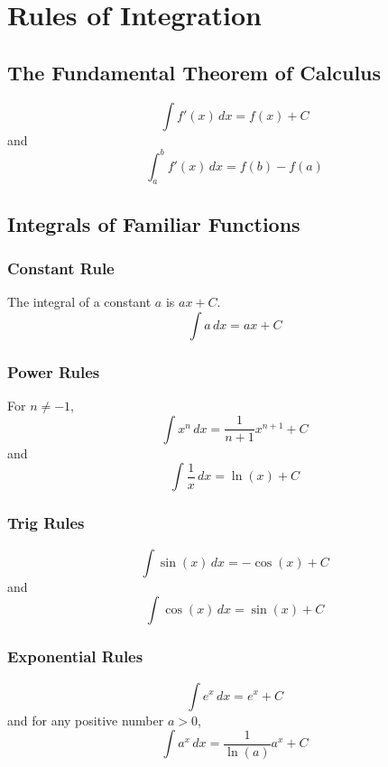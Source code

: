 \documentclass[
]{book}
\begin{document}
\hypertarget{rules-of-integration}{%
\chapter{Rules of Integration}\label{rules-of-integration}}

\hypertarget{the-fundamental-theorem-of-calculus}{%
\section{The Fundamental Theorem of Calculus}\label{the-fundamental-theorem-of-calculus}}

\[ \int f'(x) \, dx = f(x) + C\]
and
\[ \int_a^b f'(x) \, dx = f(b)-f(a)\]

\hypertarget{integrals-of-familiar-functions}{%
\section{Integrals of Familiar Functions}\label{integrals-of-familiar-functions}}

\hypertarget{constant-rule-1}{%
\subsection{Constant Rule}\label{constant-rule-1}}

The integral of a constant \(a\) is \(ax+C\).
\[\int a \, dx= ax +C\]

\hypertarget{power-rules}{%
\subsection{Power Rules}\label{power-rules}}

For \(n \neq -1\),
\[\int x^n \, dx= \frac{1}{n+1} x^{n+1} +C\]
and
\[
\int \frac{1}{x} \, dx = \ln (x) + C
\]

\hypertarget{trig-rules-1}{%
\subsection{Trig Rules}\label{trig-rules-1}}

\[\int \sin(x) \, dx = -\cos(x) +C\]
and
\[\int \cos(x) \, dx= \sin(x) + C\]

\hypertarget{exponential-rules-1}{%
\subsection{Exponential Rules}\label{exponential-rules-1}}

\[\int e^x \, dx=e^x +C\]
and for any positive number \(a >0\),
\[\int a^x \, dx =\frac{1}{\ln(a)}a^x + C\]
\end{document}
